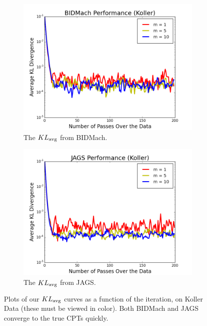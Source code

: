 \documentclass{article} %
\begin{document}
\begin{figure}[t]
\centering
\begin{subfigure}{.5\textwidth}
  \centering
  \includegraphics[width=0.9\linewidth]{fig_kldiv_koller_mb4_gpu}
  \caption{The $KL_{\rm avg}$ from BIDMach.}
  \label{fig:kl_bidmach}
\end{subfigure}%
\begin{subfigure}{.5\textwidth}
  \centering
  \includegraphics[width=0.9\linewidth]{fig_kldiv_50perc_jags}
  \caption{The $KL_{\rm avg}$ from JAGS.}
  \label{fig:kl_jags}
\end{subfigure}
\caption{Plots of our $KL_{\rm avg}$ curves as a function of the iteration, on Koller Data (these
must be viewed in color). Both BIDMach and JAGS converge to the true CPTs quickly.}
\label{fig:first_set}
\end{figure}
\end{document}
